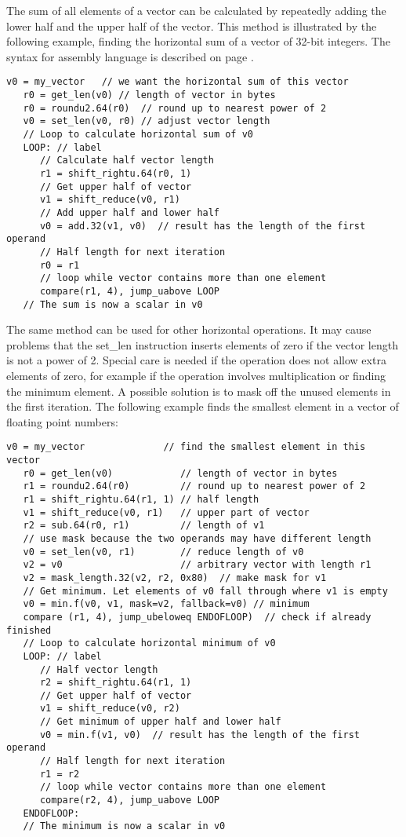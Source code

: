 \documentclass[forwardcom.tex]{subfiles}
\begin{document}
The sum of all elements of a vector can be calculated by repeatedly adding the lower half and the upper half of the vector. This method is illustrated by the following example, finding the horizontal sum of a vector of 32-bit integers. The syntax for assembly language is described on page \pageref{assemblySyntax}.

\begin{lstlisting}[frame=none]
   v0 = my_vector   // we want the horizontal sum of this vector
   r0 = get_len(v0) // length of vector in bytes
   r0 = roundu2.64(r0)  // round up to nearest power of 2
   v0 = set_len(v0, r0) // adjust vector length
   // Loop to calculate horizontal sum of v0
   LOOP: // label
      // Calculate half vector length
      r1 = shift_rightu.64(r0, 1)
      // Get upper half of vector
      v1 = shift_reduce(v0, r1)
      // Add upper half and lower half
      v0 = add.32(v1, v0)  // result has the length of the first operand
      // Half length for next iteration
      r0 = r1
      // loop while vector contains more than one element
      compare(r1, 4), jump_uabove LOOP      
   // The sum is now a scalar in v0
\end{lstlisting}

The same method can be used for other horizontal operations. It may cause problems that the set\_len instruction inserts elements of zero if the vector length is not a power of 2. Special care is needed if the operation does not allow extra elements of zero, for example if the operation involves multiplication or finding the minimum element. A possible solution is to mask off the unused elements in the first iteration. The following example finds the smallest element in a vector of floating point numbers:

\begin{lstlisting}[frame=none]
   v0 = my_vector              // find the smallest element in this vector
   r0 = get_len(v0)            // length of vector in bytes
   r1 = roundu2.64(r0)         // round up to nearest power of 2
   r1 = shift_rightu.64(r1, 1) // half length
   v1 = shift_reduce(v0, r1)   // upper part of vector
   r2 = sub.64(r0, r1)         // length of v1
   // use mask because the two operands may have different length
   v0 = set_len(v0, r1)        // reduce length of v0
   v2 = v0                     // arbitrary vector with length r1
   v2 = mask_length.32(v2, r2, 0x80)  // make mask for v1
   // Get minimum. Let elements of v0 fall through where v1 is empty
   v0 = min.f(v0, v1, mask=v2, fallback=v0) // minimum
   compare (r1, 4), jump_ubeloweq ENDOFLOOP)  // check if already finished
   // Loop to calculate horizontal minimum of v0
   LOOP: // label
      // Half vector length
      r2 = shift_rightu.64(r1, 1)
      // Get upper half of vector
      v1 = shift_reduce(v0, r2)
      // Get minimum of upper half and lower half
      v0 = min.f(v1, v0)  // result has the length of the first operand
      // Half length for next iteration
      r1 = r2
      // loop while vector contains more than one element
      compare(r2, 4), jump_uabove LOOP      
   ENDOFLOOP:      
   // The minimum is now a scalar in v0
\end{lstlisting}
\end{document}
